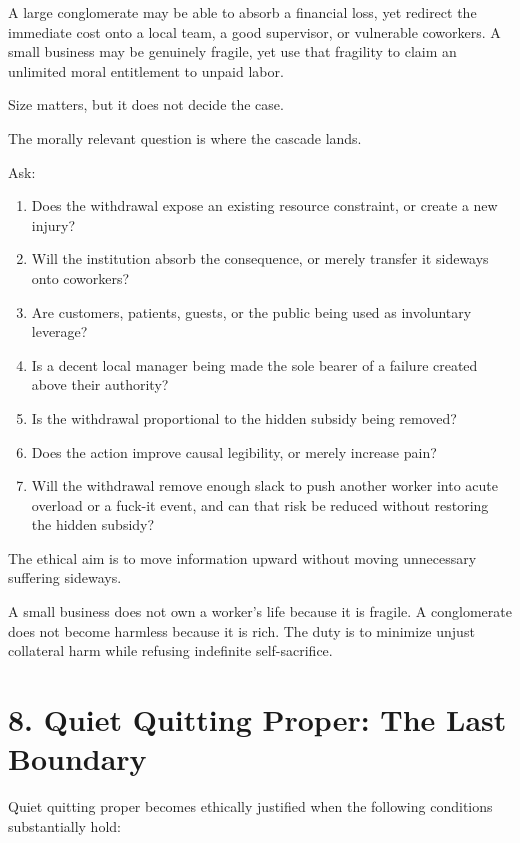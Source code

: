 \documentclass[11pt,oneside]{article}
\providecommand{\tightlist}{%
  \setlength{\itemsep}{0.22em}\setlength{\parskip}{0pt}}
\begin{document}
A large conglomerate may be able to absorb a financial loss, yet
redirect the immediate cost onto a local team, a good supervisor, or
vulnerable coworkers. A small business may be genuinely fragile, yet use
that fragility to claim an unlimited moral entitlement to unpaid labor.

Size matters, but it does not decide the case.

The morally relevant question is where the cascade lands.

Ask:

\begin{enumerate}
\def\labelenumi{\arabic{enumi}.}
\tightlist
\item
  Does the withdrawal expose an existing resource constraint, or create
  a new injury?
\item
  Will the institution absorb the consequence, or merely transfer it
  sideways onto coworkers?
\item
  Are customers, patients, guests, or the public being used as
  involuntary leverage?
\item
  Is a decent local manager being made the sole bearer of a failure
  created above their authority?
\item
  Is the withdrawal proportional to the hidden subsidy being removed?
\item
  Does the action improve causal legibility, or merely increase pain?
\item
  Will the withdrawal remove enough slack to push another worker into
  acute overload or a fuck-it event, and can that risk be reduced
  without restoring the hidden subsidy?
\end{enumerate}

The ethical aim is to move information upward without moving unnecessary
suffering sideways.

A small business does not own a worker's life because it is fragile. A
conglomerate does not become harmless because it is rich. The duty is to
minimize unjust collateral harm while refusing indefinite
self-sacrifice.

\section{8. Quiet Quitting Proper: The Last
Boundary}\label{quiet-quitting-proper-the-last-boundary}

Quiet quitting proper becomes ethically justified when the following
conditions substantially hold:
\end{document}
